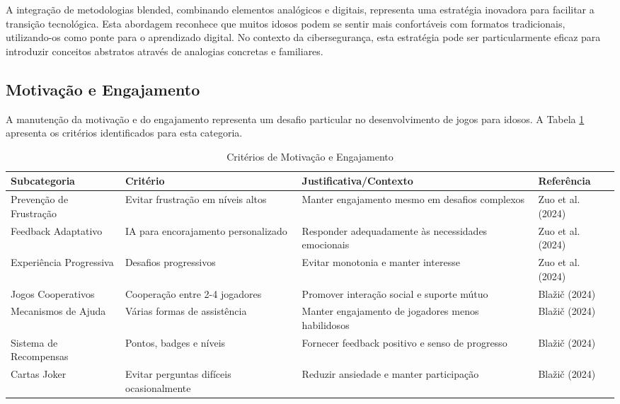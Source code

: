 A integração de metodologias blended, combinando elementos analógicos e digitais, representa uma estratégia inovadora para facilitar a transição tecnológica. Esta abordagem reconhece que muitos idosos podem se sentir mais confortáveis com formatos tradicionais, utilizando-os como ponte para o aprendizado digital. No contexto da cibersegurança, esta estratégia pode ser particularmente eficaz para introduzir conceitos abstratos através de analogias concretas e familiares.

\subsection{Motivação e Engajamento}
\label{subsec:motivacao}

A manutenção da motivação e do engajamento representa um desafio particular no desenvolvimento de jogos para idosos. A Tabela \ref{tab:motivacao} apresenta os critérios identificados para esta categoria.

\begin{table}[H]
\centering
\caption{Critérios de Motivação e Engajamento}
\label{tab:motivacao}
\begin{tabular}{p{2.5cm}p{3cm}p{5cm}p{3cm}}
\hline
\textbf{Subcategoria} & \textbf{Critério} & \textbf{Justificativa/Contexto} & \textbf{Referência} \\ \hline
Prevenção de Frustração & Evitar frustração em níveis altos & Manter engajamento mesmo em desafios complexos & Zuo et al. (2024) \\
Feedback Adaptativo & IA para encorajamento personalizado & Responder adequadamente às necessidades emocionais & Zuo et al. (2024) \\
Experiência Progressiva & Desafios progressivos & Evitar monotonia e manter interesse & Zuo et al. (2024) \\
Jogos Cooperativos & Cooperação entre 2-4 jogadores & Promover interação social e suporte mútuo & Blažič (2024) \\
Mecanismos de Ajuda & Várias formas de assistência & Manter engajamento de jogadores menos habilidosos & Blažič (2024) \\
Sistema de Recompensas & Pontos, badges e níveis & Fornecer feedback positivo e senso de progresso & Blažič (2024) \\
Cartas Joker & Evitar perguntas difíceis ocasionalmente & Reduzir ansiedade e manter participação & Blažič (2024) \\
\hline
\end{tabular}
\end{table}

